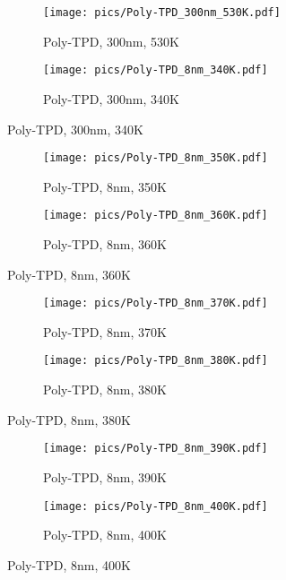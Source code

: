 \begin{figure}[!htb]
\centering
\begin{subfigure}[t]{.5\textwidth}
  \centering
  \texttt{[image: pics/Poly-TPD\_300nm\_530K.pdf]}
  \caption{Poly-TPD, 300nm, 530K}
  \label{fig:sub89}
\end{subfigure}%
\begin{subfigure}[t]{.5\textwidth}
  \centering
  \texttt{[image: pics/Poly-TPD\_8nm\_340K.pdf]}
  \caption{Poly-TPD, 300nm, 340K}
  \label{fig:sub90}
\end{subfigure}%
\end{figure}

\begin{figure}[!htb]
\centering
\begin{subfigure}[t]{.5\textwidth}
  \centering
  \texttt{[image: pics/Poly-TPD\_8nm\_350K.pdf]}
  \caption{Poly-TPD, 8nm, 350K}
  \label{fig:sub91}
\end{subfigure}%
\begin{subfigure}[t]{.5\textwidth}
  \centering
  \texttt{[image: pics/Poly-TPD\_8nm\_360K.pdf]}
  \caption{Poly-TPD, 8nm, 360K}
  \label{fig:sub92}
\end{subfigure}%
\end{figure}

\begin{figure}[!htb]
\centering
\begin{subfigure}[t]{.5\textwidth}
  \centering
  \texttt{[image: pics/Poly-TPD\_8nm\_370K.pdf]}
  \caption{Poly-TPD, 8nm, 370K}
  \label{fig:sub93}
\end{subfigure}%
\begin{subfigure}[t]{.5\textwidth}
  \centering
  \texttt{[image: pics/Poly-TPD\_8nm\_380K.pdf]}
  \caption{Poly-TPD, 8nm, 380K}
  \label{fig:sub94}
\end{subfigure}%
\end{figure}

\begin{figure}[!htb]
\centering
\begin{subfigure}[t]{.5\textwidth}
  \centering
  \texttt{[image: pics/Poly-TPD\_8nm\_390K.pdf]}
  \caption{Poly-TPD, 8nm, 390K}
  \label{fig:sub95}
\end{subfigure}%
\begin{subfigure}[t]{.5\textwidth}
  \centering
  \texttt{[image: pics/Poly-TPD\_8nm\_400K.pdf]}
  \caption{Poly-TPD, 8nm, 400K}
  \label{fig:sub96}
\end{subfigure}%
\end{figure}

